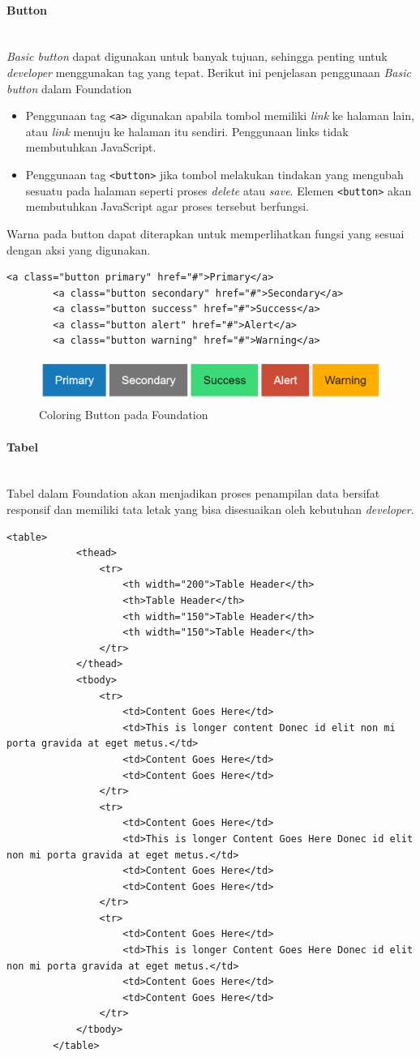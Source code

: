 \documentclass[a4paper,twoside]{article}
\newcommand{\myparagraph}[1]{\paragraph{#1}\mbox{}\\}
\begin{document}
\begin{enumerate}
				
		\myparagraph{Button}
		\textit{Basic button} dapat digunakan untuk banyak tujuan, sehingga penting untuk \textit{developer} menggunakan tag yang tepat. Berikut ini penjelasan penggunaan \textit{Basic button} dalam Foundation
		\begin{itemize}
			\item Penggunaan tag \colorbox{mygray}{\texttt{<a>}} digunakan apabila tombol memiliki \textit{link} ke halaman lain, atau \textit{link} menuju ke halaman itu sendiri. Penggunaan links tidak membutuhkan JavaScript.
			\item Penggunaan tag \colorbox{mygray}{\texttt{<button>}} jika tombol melakukan tindakan yang mengubah sesuatu pada halaman seperti proses \textit{delete} atau \textit{save}. Elemen \texttt{<button>} akan membutuhkan JavaScript agar proses tersebut berfungsi. 
		\end{itemize}
		
			
		\noindent Warna pada button dapat diterapkan untuk memperlihatkan fungsi yang sesuai dengan aksi yang digunakan.
		\begin{lstlisting}[frame=single] 
		<a class="button primary" href="#">Primary</a>
		<a class="button secondary" href="#">Secondary</a>
		<a class="button success" href="#">Success</a>
		<a class="button alert" href="#">Alert</a>
		<a class="button warning" href="#">Warning</a>
		\end{lstlisting}
		
		\begin{figure} [H]
			\centering  
			\includegraphics[scale=0.7]{coloringbutton_zurb.png}  
			\caption{Coloring Button pada Foundation}
		\end{figure}
		
		\myparagraph{Tabel}
		
		Tabel dalam Foundation akan menjadikan proses penampilan data bersifat responsif dan memiliki tata letak yang bisa disesuaikan oleh kebutuhan \textit{developer}.
		
		
		\begin{lstlisting}[frame=single, basicstyle=\tiny] 
		<table>
			<thead>
				<tr>
					<th width="200">Table Header</th>
					<th>Table Header</th>
					<th width="150">Table Header</th>
					<th width="150">Table Header</th>
				</tr>
			</thead>
			<tbody>
				<tr>
					<td>Content Goes Here</td>
					<td>This is longer content Donec id elit non mi porta gravida at eget metus.</td>
					<td>Content Goes Here</td>
					<td>Content Goes Here</td>
				</tr>
				<tr>
					<td>Content Goes Here</td>
					<td>This is longer Content Goes Here Donec id elit non mi porta gravida at eget metus.</td>
					<td>Content Goes Here</td>
					<td>Content Goes Here</td>
				</tr>
				<tr>
					<td>Content Goes Here</td>
					<td>This is longer Content Goes Here Donec id elit non mi porta gravida at eget metus.</td>
					<td>Content Goes Here</td>
					<td>Content Goes Here</td>
				</tr>
			</tbody>
		</table>
		\end{lstlisting}
		

\end{enumerate}
\end{document}
